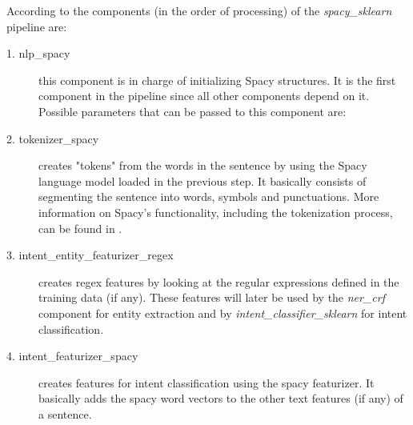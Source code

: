 \documentclass[11pt,a4paper]{article}
\begin{document}
			According to \cite{rasanlu} the components (in the order of processing) of the \textit{spacy\_sklearn} pipeline are:
			
			\begin{description}
				\item[1. nlp\_spacy] 
				this component is in charge of initializing Spacy structures. It is the first component in the pipeline since all other components depend on it. Possible parameters that can be passed to this component are: 
				
				\item[2. tokenizer\_spacy] 
				creates "tokens" from the words in the sentence by using the Spacy language model loaded in the previous step. It basically consists of segmenting the sentence into words, symbols and punctuations. More information on Spacy's functionality, including the tokenization process, can be found in \cite{spacy-tokenization}.
				
				\item[3. intent\_entity\_featurizer\_regex] 
				creates regex features by looking at the regular expressions defined in the training data (if any). These features will later be used by the \textit{ner\_crf} component for entity extraction and by \textit{intent\_classifier\_sklearn} for intent classification.
				
				\item[4. intent\_featurizer\_spacy] 
				creates features for intent classification using the spacy featurizer. It basically adds the spacy word vectors to the other text features (if any) of a sentence.
				

\end{description}
\end{document}
